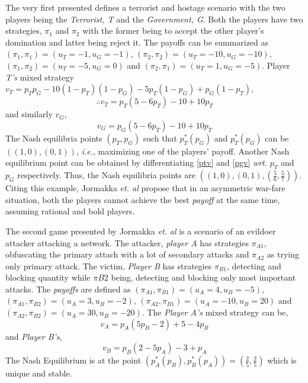 \documentclass[conference]{IEEEtran}
\begin{document}
The very first presented defines a terrorist and hostage scenario with the two players being the \textit{Terrorist, T} and the \textit{Government, G}.
Both the players have two strategies, $\pi_{1}$ and $\pi_{2}$ with the former being to accept the other player's domination and latter being reject it.
The payoffs can be summarized as $(\pi_{1}, \pi_{1}) = (u_{T} = -1, u_{G} = -1)$, $(\pi_{2}, \pi_{2}) = (u_{T} = -10, u_{G} = -10)$, $(\pi_{1}, \pi_{2}) = (u_{T} = -5, u_{G} = 0)$ and $(\pi_{2}, \pi_{1}) = (u_{T} = 1, u_{G} = -5)$.
Player \textit{T's} mixed strategy\\
$v_{T} = p_{T}p_{G}-10(1-p_{T})(1-p_{G})-5p_{T}(1-p_{G})+p_{G}(1-p_{T}) $,
\begin{equation} \label{ptv}
        \therefore v_{T} = p_{T}(5-6p_{T})-10+10p_{T}
\end{equation}
and similarly $v_{G}$,
\begin{equation} \label{pgv}
        v_{G} = p_{G}(5-6p_{T})-10+10p_{T}
\end{equation}
The Nash equilibria points $(p_{T}, p_{G})$ such that $p^{*}_{T}(p_{G})$ and $p^{*}_{T}(p_{G})$ can be $((1,0), (0, 1))$, \textit{i.e.}, maximizing one of the players' payoff.
Another Nash equilibrium point can be obtained by differentiating \ref{ptv} and \ref{pgv} \textit{wrt.} $p_{T}$ and $p_{G}$ respectively.
Thus, the Nash equilibria points are $((1,0), (0,1), (\frac{5}{6}, \frac{5}{7}))$.
Citing this example, Jormakka \textit{et. al} \cite{static} propose that in an asymmetric war-fare situation, both the players cannot achieve the best \textit{payoff} at the same time, assuming rational and bold players.

The second game presented by Jormakka \textit{et. al} \cite{static} is a scenario of an evildoer attacker attacking a network.
The attacker, \textit{player A} has strategies $\pi_{A1}$, obfuscating the primary attach with a lot of secondary attacks and $\pi_{A2}$ as trying only primary attack.
The victim, \textit{Player B} has strategies $\pi_{B1}$, detecting and blocking quantity while $\pi{B2}$ being, detecting and blocking only most important attacks.
The \textit{payoffs} are defined as $(\pi_{A1}, \pi_{B1}) = (u_{A} = 4, u_{B} = -5)$, $(\pi_{A1}, \pi_{B2}) = (u_{A} = 3, u_{B} = -2)$, $(\pi_{A2}, \pi_{B1}) = (u_{A} = -10, u_{B} = 20)$ and $(\pi_{A2}, \pi_{B2}) = (u_{A} = 30, u_{B} = -20)$.
The \textit{Player A's} mixed strategy can be,
\begin{equation} \label{pva}
        v_{A} = p_{A}(5p_{B}-2)+5-4p_{B}
\end{equation}
and \textit{Player B's},
\begin{equation} \label{pvb}
        v_{B} = p_{B}(2-5p_{A})-3+p_{A}
\end{equation}
The Nash Equilibrium is at the point $(p^{*}_{A}(p_{B}), p^{*}_{B}(p_{A})) = (\frac{2}{5}, \frac{2}{5})$ which is unique and stable.
\end{document}
